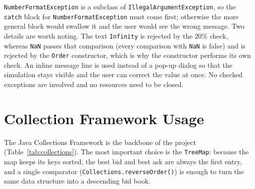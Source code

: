 \documentclass[12pt,a4paper,openany,oneside]{report}
\newcommand{\code}[1]{\texttt{#1}}
\begin{document}
\code{NumberFormatException} is a subclass of \code{IllegalArgumentException}, so the \code{catch} block for \code{NumberFormatException} must come first; otherwise the more general block would swallow it and the user would see the wrong message. Two details are worth noting. The text \code{Infinity} is rejected by the 20\% check, whereas \code{NaN} passes that comparison (every comparison with \code{NaN} is false) and is rejected by the \code{Order} constructor, which is why the constructor performs its own check. An inline message line is used instead of a pop-up dialog so that the simulation stays visible and the user can correct the value at once. No checked exceptions are involved and no resources need to be closed.

\section{Collection Framework Usage}

The Java Collections Framework \cite{collectionstutorial} is the backbone of the project (Table~\ref{tab:collections}). The most important choice is the \code{TreeMap}: because the map keeps its keys sorted, the best bid and best ask are always the first entry, and a single comparator (\code{Collections.reverseOrder()}) is enough to turn the same data structure into a descending bid book.
\end{document}
